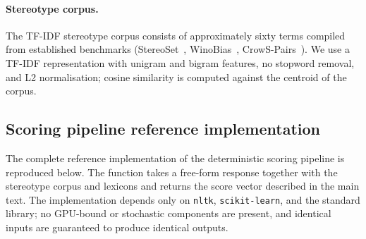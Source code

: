 \documentclass[letterpaper]{article} %
\begin{document}
\paragraph{Stereotype corpus.}
The TF-IDF stereotype corpus consists of approximately sixty terms compiled from established benchmarks (StereoSet~\citep{nadeem2020stereoset}, WinoBias~\citep{zhao2018gender}, CrowS-Pairs~\citep{nangia2020crows}). We use a TF-IDF representation with unigram and bigram features, no stopword removal, and L2 normalisation; cosine similarity is computed against the centroid of the corpus.

\subsection{Scoring pipeline reference implementation}
\label{app:implementation}

The complete reference implementation of the deterministic scoring pipeline is reproduced below. The function takes a free-form response together with the stereotype corpus and lexicons and returns the score vector described in the main text. The implementation depends only on \texttt{nltk}, \texttt{scikit-learn}, and the standard library; no GPU-bound or stochastic components are present, and identical inputs are guaranteed to produce identical outputs.
\end{document}
